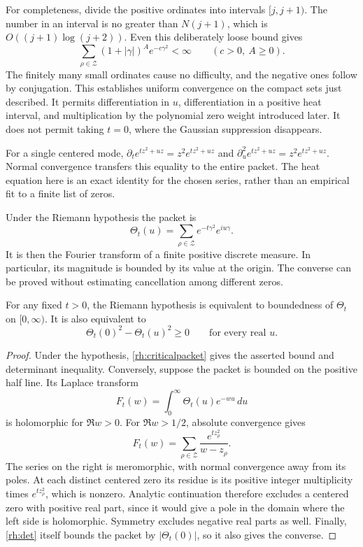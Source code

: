 For completeness, divide the positive ordinates into intervals \([j,j+1)\). The number in an interval is no greater than \(N(j+1)\), which is \(O((j+1)\log(j+2))\). Even this deliberately loose bound gives
\[
\sum_{\rho\in\mathcal Z}(1+|\gamma|)^A e^{-c\gamma^2}<\infty
\qquad(c>0,\ A\ge0).
\]
The finitely many small ordinates cause no difficulty, and the negative ones follow by conjugation. This establishes uniform convergence on the compact sets just described. It permits differentiation in \(u\), differentiation in a positive heat interval, and multiplication by the polynomial zero weight introduced later. It does not permit taking \(t=0\), where the Gaussian suppression disappears.

For a single centered mode, \(\partial_t e^{tz^2+uz}=z^2e^{tz^2+uz}\) and \(\partial_u^2e^{tz^2+uz}=z^2e^{tz^2+uz}\). Normal convergence transfers this equality to the entire packet. The heat equation here is an exact identity for the chosen series, rather than an empirical fit to a finite list of zeros.

Under the Riemann hypothesis the packet is
\begin{equation}\label{rh:criticalpacket}
\Theta_t(u)=\sum_{\rho\in\mathcal Z}e^{-t\gamma^2}e^{iu\gamma}.
\end{equation}
It is then the Fourier transform of a finite positive discrete measure. In particular, its magnitude is bounded by its value at the origin. The converse can be proved without estimating cancellation among different zeros.

\begin{theorem}\label{rh:bounded}
For any fixed \(t>0\), the Riemann hypothesis is equivalent to boundedness of \(\Theta_t\) on \([0,\infty)\). It is also equivalent to
\begin{equation}\label{rh:det}
\Theta_t(0)^2-\Theta_t(u)^2\ge0
\qquad\text{for every real }u.
\end{equation}
\end{theorem}

\begin{proof}
Under the hypothesis, \eqref{rh:criticalpacket} gives the asserted bound and determinant inequality. Conversely, suppose the packet is bounded on the positive half line. Its Laplace transform
\[
F_t(w)=\int_0^{\infty}\Theta_t(u)e^{-wu}\,du
\]
is holomorphic for \(\Re w>0\). For \(\Re w>1/2\), absolute convergence gives
\begin{equation}\label{rh:laplace}
F_t(w)=\sum_{\rho\in\mathcal Z}
\frac{e^{tz_\rho^2}}{w-z_\rho}.
\end{equation}
The series on the right is meromorphic, with normal convergence away from its poles. At each distinct centered zero its residue is its positive integer multiplicity times \(e^{tz_\rho^2}\), which is nonzero. Analytic continuation therefore excludes a centered zero with positive real part, since it would give a pole in the domain where the left side is holomorphic. Symmetry excludes negative real parts as well. Finally, \eqref{rh:det} itself bounds the packet by \(|\Theta_t(0)|\), so it also gives the converse.
\end{proof}


